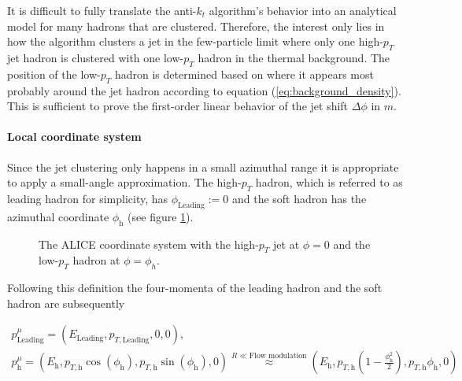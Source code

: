 \documentclass[
  a4paper,
  12pt,
  oneside,
  parskip=half,
  listof=totoc,
  bibliography=totoc,
  DIV=12,
  numbers=noenddot,
  BA.tex
  ]{subfiles}
\begin{document}
It is difficult to fully translate the anti-$k_t$ algorithm's behavior into an analytical model for many hadrons that are clustered. Therefore, the interest only lies in how the algorithm clusters a jet in the few-particle limit where only one high-$p_T$ jet hadron is clustered with one low-$p_T$ hadron in the thermal background. The position of the low-$p_T$ hadron is determined based on where it appears most probably around the jet hadron according to equation (\ref{eq:background_density}). This is sufficient to prove the first-order linear behavior of the jet shift $\Delta \phi$ in $m$.

\paragraph{Local coordinate system}

Since the jet clustering only happens in a small azimuthal range it is appropriate to apply a small-angle approximation. The high-$p_T$ hadron, which is referred to as leading hadron for simplicity, has $\phi_\text{Leading} := 0$ and the soft hadron has the azimuthal coordinate $\phi_\text{h}$ (see figure \ref{fig:localcoord-shift}).

\begin{figure}[H]
	\centering
	\caption{The ALICE coordinate system with the high-$p_T$ jet at $\phi = 0$ and the low-$p_T$ hadron at $\phi = \phi_h$.}
	\label{fig:localcoord-shift}
\end{figure}

Following this definition the four-momenta of the leading hadron and the soft hadron are subsequently

\begin{equation}
	\begin{gathered}
		p_\text{Leading}^\mu = (E_\text{Leading}, p_{T,\text{Leading}}, 0, 0), \\
		p_\text{h}^\mu = (E_\text{h}, p_{T,\text{h}} \cos(\phi_\text{h}), p_{T,\text{h}} \sin(\phi_\text{h}), 0) \stackrel{R \ll \text{Flow modulation}}{\approx} (E_\text{h}, p_{T,\text{h}} (1-\frac{\phi_\text{h}^2}{2}), p_{T,\text{h}} \phi_\text{h}, 0)
	\end{gathered}
	\label{eq:four-momenta-approximation}
\end{equation}
\end{document}
